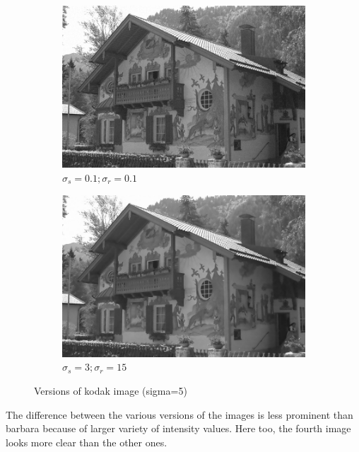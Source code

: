 \documentclass[12pt]{article}
\begin{document}
\begin{figure}[h]
\begin{subfigure}[b]{0.24\textwidth}
        \includegraphics[width=\textwidth]{../images/filtered_kodak_5_sigma_s_0.1_sigma_r_0.1.png}
        \caption{$\sigma_s=0.1;\sigma_r=0.1$}
        \label{fig:subfig3}
    \end{subfigure}
    \begin{subfigure}[b]{0.24\textwidth}
        \centering
        \includegraphics[width=\textwidth]{../images/filtered_kodak_5_sigma_s_3_sigma_r_15.png}
        \caption{$\sigma_s=3;\sigma_r=15$}
        \label{fig:subfig3}
    \end{subfigure}
    
    \caption{Versions of kodak image (sigma=5)}
    \label{fig:overall}
\end{figure}


The difference between the various versions of the images is less prominent than barbara because of larger variety of intensity values. Here too, the fourth image looks more clear than the other ones.
\end{document}
